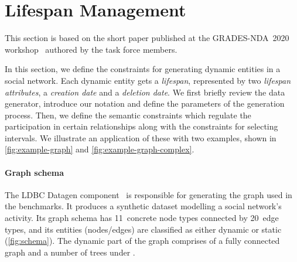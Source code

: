 \section{Lifespan Management}
\label{sec:lifespan-management}

This section is based on the short paper published at the GRADES-NDA~2020 workshop~\cite{DBLP:conf/sigmod/WaudbySPS20} authored by the task force members.


In this section, we define the constraints for generating dynamic entities in a social network. Each dynamic entity gets a \emph{lifespan}, represented by two \emph{lifespan attributes}, a \emph{creation date} and a \emph{deletion date}.
We first briefly review the data generator, introduce our notation and define the parameters of the generation process. Then, we define the semantic constraints which regulate the participation in certain relationships along with the constraints for selecting intervals. We illustrate an application of these with two examples, shown in \autoref{fig:example-graph} and \autoref{fig:example-graph-complex}.

\paragraph{Graph schema}

The LDBC Datagen component~\cite{Pham2012,Datagen} is responsible for generating the graph used in the benchmarks. It produces a synthetic dataset modelling a social network's activity. Its graph schema has 11~concrete node types connected by 20~edge types, and its entities (nodes/edges) are classified as either dynamic or static (\autoref{fig:schema}).
The dynamic part of the graph comprises of a fully connected \tPerson graph and a number of \tMessage trees under \tForums.

